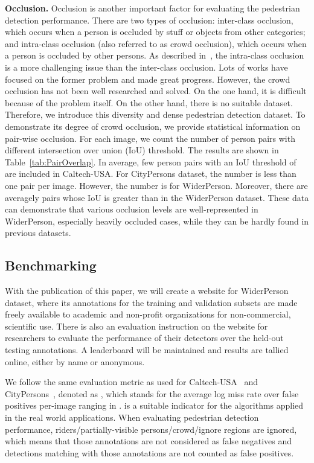 \documentclass[journal]{IEEEtran}
\begin{document}
{\flushleft \textbf{Occlusion. }}
Occlusion is another important factor for evaluating the pedestrian detection performance. There are two types of occlusion: inter-class occlusion, which occurs when a person is occluded by stuff or objects from other categories; and intra-class occlusion (also referred to as crowd occlusion), which occurs when a person is occluded by other persons. As described in~\cite{DBLP:journals/corr/abs-1711-07752}, the intra-class occlusion is a more challenging issue than the inter-class occlusion. Lots of works have focused on the former problem and made great progress. However, the crowd occlusion has not been well researched and solved. On the one hand, it is difficult because of the problem itself. On the other hand, there is no suitable dataset. Therefore, we introduce this diversity and dense pedestrian detection dataset. To demonstrate its degree of crowd occlusion, we provide statistical information on pair-wise occlusion. For each image, we count the number of person pairs with different intersection over union (IoU) threshold. The results are shown in Table~\ref{tab:PairOverlap}. In average, few person pairs with an IoU threshold of  are included in Caltech-USA. For CityPersons dataset, the number is less than one pair per image. However, the number is  for WiderPerson. Moreover, there are averagely  pairs whose IoU is greater than  in the WiderPerson dataset. These data can demonstrate that various occlusion levels are well-represented in WiderPerson, especially heavily occluded cases, while they can be hardly found in previous datasets.


\subsection{Benchmarking}\label{subsec:benchmarking}
With the publication of this paper, we will create a website for WiderPerson dataset, where its annotations for the training and validation subsets are made freely available to academic and non-profit organizations for non-commercial, scientific use. There is also an evaluation instruction on the website for researchers to evaluate the performance of their detectors over the held-out testing annotations. A leaderboard will be maintained and results are tallied online, either by name or anonymous.

We follow the same evaluation metric as used for Caltech-USA~\cite{DBLP:journals/pami/DollarWSP12} and CityPersons~\cite{DBLP:conf/cvpr/ZhangBS17}, denoted as , which stands for the average log miss rate over false positives per-image ranging in .  is a suitable indicator for the algorithms applied in the real world applications. When evaluating pedestrian detection performance, riders/partially-visible persons/crowd/ignore regions are ignored, which means that those annotations are not considered as false negatives and detections matching with those annotations are not counted as false positives.
\end{document}

